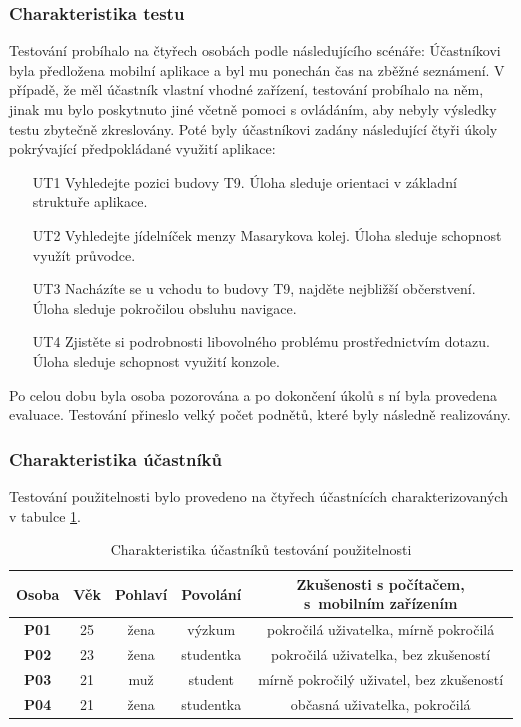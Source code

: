 \subsubsection{Charakteristika testu}
Testování probíhalo na čtyřech osobách podle následujícího scénáře: Účastníkovi byla předložena mobilní aplikace a byl mu ponechán čas na zběžné seznámení. V případě, že měl účastník vlastní vhodné zařízení, testování probíhalo na něm, jinak mu bylo poskytnuto jiné včetně pomoci s ovládáním, aby nebyly výsledky testu zbytečně zkreslovány. Poté byly účastníkovi zadány následující čtyři úkoly pokrývající předpokládané využití aplikace:
\begin{enumerate}
 \item[UT1] Vyhledejte pozici budovy T9. Úloha sleduje orientaci v základní struktuře aplikace.
 \item[UT2] Vyhledejte jídelníček menzy Masarykova kolej. Úloha sleduje schopnost využít průvodce.
 \item[UT3] Nacházíte se u vchodu to budovy T9, najděte nejbližší občerstvení. Úloha sleduje pokročilou obsluhu navigace.
 \item[UT4] Zjistěte si podrobnosti libovolného problému prostřednictvím  dotazu. Úloha sleduje schopnost využití  konzole.
\end{enumerate}
Po celou dobu byla osoba pozorována a po dokončení úkolů s ní byla provedena evaluace. Testování přineslo velký počet podnětů, které byly následně realizovány.

\subsubsection{Charakteristika účastníků}
Testování použitelnosti bylo provedeno na čtyřech účastnících charakterizovaných v tabulce \ref{tab:charakteristikaUcastniku}. %
\begin{table}
\begin{center}
\begin{threeparttable}
\begin{tabular}{|c|c|c|c|c|}
\hline
\textbf{Osoba} & \textbf{Věk} & \textbf{Pohlaví} & \textbf{Povolání} & \parbox{2.2in}{\smallskip\textbf{Zkušenosti s počítačem, s~mobilním zařízením}\smallskip} \\
\hline
\textbf{P01} & 25 & žena & výzkum & \parbox{2.2in}{\smallskip pokročilá uživatelka, mírně pokročilá\smallskip} \\
\textbf{P02} & 23 & žena & studentka & \parbox{2.2in}{\smallskip pokročilá uživatelka, bez zkušeností\smallskip} \\
\textbf{P03} & 21 & muž & student & \parbox{2.2in}{\smallskip mírně pokročilý uživatel, bez zkušeností\smallskip} \\
\textbf{P04} & 21 & žena & studentka & \parbox{2.2in}{\smallskip občasná uživatelka, pokročilá\smallskip} \\
\hline
\end{tabular}
\caption{Charakteristika účastníků testování použitelnosti}
\label{tab:charakteristikaUcastniku}
\end{threeparttable}
\end{center}
\end{table}

